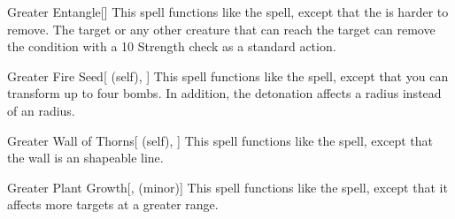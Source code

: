 \lowercase{\hypertarget{spell:Greater Entangle}{}}\label{spell:Greater Entangle}
\begin{freeability}[\nth{4}]{\hypertarget{spell:Greater Entangle}{Greater Entangle}}[]
This spell functions like the  spell, except that the  is harder to remove.
The target or any other creature that can reach the target can remove the condition with a  10 Strength check as a standard action.
\end{freeability}
\vspace{0.25em}



\lowercase{\hypertarget{spell:Greater Fire Seed}{}}\label{spell:Greater Fire Seed}
\begin{attuneability}[\nth{4}]{\hypertarget{spell:Greater Fire Seed}{Greater Fire Seed}}[ (self), ]
This spell functions like the  spell, except that you can transform up to four bombs.
In addition, the detonation affects a \areamed radius instead of an \areasmall radius.
\end{attuneability}
\vspace{0.25em}



\lowercase{\hypertarget{spell:Greater Wall of Thorns}{}}\label{spell:Greater Wall of Thorns}
\begin{attuneability}[\nth{4}]{\hypertarget{spell:Greater Wall of Thorns}{Greater Wall of Thorns}}[ (self), ]
This spell functions like the  spell, except that the wall is an \arealarge shapeable line.
\end{attuneability}
\vspace{0.25em}



\lowercase{\hypertarget{spell:Greater Plant Growth}{}}\label{spell:Greater Plant Growth}
\begin{freeability}[\nth{5}]{\hypertarget{spell:Greater Plant Growth}{Greater Plant Growth}}[,  (minor)]
This spell functions like the  spell, except that it affects more targets at a greater range.
\end{freeability}
\vspace{0.25em}




